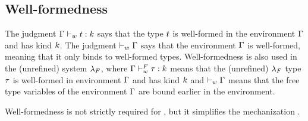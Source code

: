 \subsection{Well-formedness}
\label{sec:typing:wf}

%
The judgment ${\mathrm{\Gamma}} \vdash_w {t} : {k}$
says that the type $t$ is well-formed in the environment
$\mathrm{\Gamma}$ and has kind $k$.
%
The judgment $\vdash_w {\mathrm{\Gamma}}$ says that the
environment $\mathrm{\Gamma}$ is well-formed, meaning
that it only binds to well-formed
types.
%
Well-formedness is also used in the (unrefined) system $\lambda_{F}$, where
${\mathrm{\Gamma}} \vdash_w^F {\tau} : {k}$
means that the (unrefined) $\lambda_{F}$ type
$\tau$ is well-formed in environment
$\mathrm{\Gamma}$ and has kind $k$
and $\vdash_w {\mathrm{\Gamma}}$ means
that the free type variables
of the
environment $\mathrm{\Gamma}$ are bound earlier in the environment.
%
\begin{fullversion}
Well-formedness is not strictly
required for \sysf, but it 
simplifies the mechanization \cite{Remy21}.
\end{fullversion}


